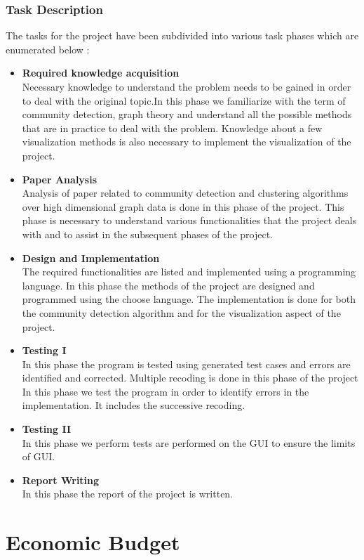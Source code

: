\subsubsection{Task Description}
The tasks for the project have been subdivided into various task phases which are enumerated below : 
\begin{itemize}
\item \textbf{Required knowledge acquisition}\\
Necessary knowledge to understand the problem needs to be gained in order to deal with the original topic.In this phase we familiarize with the term of community detection, graph theory and understand all the possible methods that are in practice to deal with the problem. Knowledge about a few visualization methods is also necessary to implement the visualization of the project.
\item \textbf{Paper Analysis}\\ 
Analysis of paper related to community detection and clustering algorithms over high dimensional graph data is done in this phase of the project. This phase is necessary to understand various functionalities that the project deals with and to assist in the subsequent phases of the project.
\item \textbf{Design and Implementation} \\
The required functionalities are listed and implemented using a programming language. In this phase the methods of the project are designed and programmed using the choose language. 
The implementation is done for both the community detection algorithm and for the visualization aspect of the project.
\item \textbf{Testing I}\\
In this phase the program is tested using generated test cases and errors are identified and corrected. Multiple recoding is done in this phase of the project
In this phase we test the program in order to identify errors in
the implementation. It includes the successive recoding.
\item \textbf{Testing II}\\
In this phase we perform tests are performed on the GUI to ensure the limits of GUI. 
\item \textbf{Report Writing}\\
In this phase the report of the project is written.
\end{itemize} 
\section{Economic Budget}
